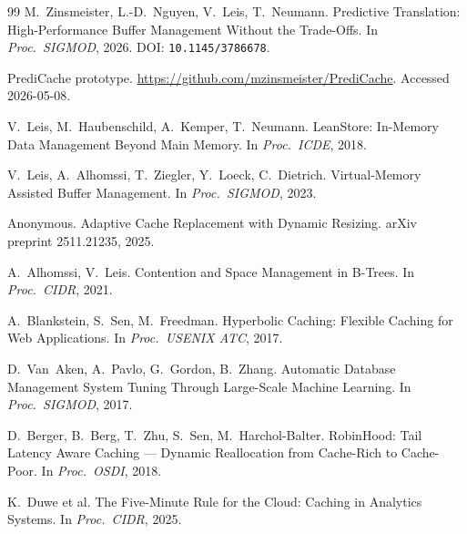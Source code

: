 \documentclass[10pt,twocolumn]{article}
\begin{document}
\begin{thebibliography}{99}\small
{}
M.~Zinsmeister, L.-D.~Nguyen, V.~Leis, T.~Neumann.
\newblock Predictive Translation: High-Performance Buffer Management
  Without the Trade-Offs.
\newblock In \textit{Proc.~SIGMOD}, 2026. DOI: \texttt{10.1145/3786678}.

PrediCache prototype.
\newblock
  \url{https://github.com/mzinsmeister/PrediCache}. Accessed 2026-05-08.

V.~Leis, M.~Haubenschild, A.~Kemper, T.~Neumann.
\newblock LeanStore: In-Memory Data Management Beyond Main Memory.
\newblock In \textit{Proc.~ICDE}, 2018.

V.~Leis, A.~Alhomssi, T.~Ziegler, Y.~Loeck, C.~Dietrich.
\newblock Virtual-Memory Assisted Buffer Management.
\newblock In \textit{Proc.~SIGMOD}, 2023.

Anonymous.
\newblock Adaptive Cache Replacement with Dynamic Resizing.
\newblock arXiv preprint 2511.21235, 2025.

A.~Alhomssi, V.~Leis.
\newblock Contention and Space Management in B-Trees.
\newblock In \textit{Proc.~CIDR}, 2021.

A.~Blankstein, S.~Sen, M.~Freedman.
\newblock Hyperbolic Caching: Flexible Caching for Web Applications.
\newblock In \textit{Proc.~USENIX ATC}, 2017.

D.~Van~Aken, A.~Pavlo, G.~Gordon, B.~Zhang.
\newblock Automatic Database Management System Tuning Through
  Large-Scale Machine Learning.
\newblock In \textit{Proc.~SIGMOD}, 2017.

D.~Berger, B.~Berg, T.~Zhu, S.~Sen, M.~Harchol-Balter.
\newblock RobinHood: Tail Latency Aware Caching --- Dynamic Reallocation
  from Cache-Rich to Cache-Poor.
\newblock In \textit{Proc.~OSDI}, 2018.

K.~Duwe et al.
\newblock The Five-Minute Rule for the Cloud: Caching in Analytics Systems.
\newblock In \textit{Proc.~CIDR}, 2025.

\end{thebibliography}
\end{document}
